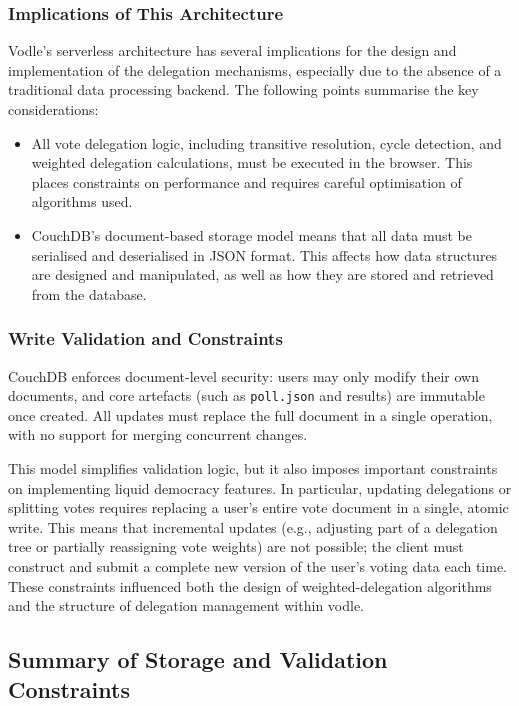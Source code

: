 \subsubsection{Implications of This Architecture}
Vodle's serverless architecture has several implications for the design and implementation of the delegation mechanisms, especially due to the absence of a traditional data processing backend. The following points summarise the key considerations:
\begin{itemize}
  \item All vote delegation logic, including transitive resolution, cycle detection, and weighted delegation calculations, must be executed in the browser. This places constraints on performance and requires careful optimisation of algorithms used.
  \item CouchDB's document-based storage model means that all data must be serialised and deserialised in JSON format. This affects how data structures are designed and manipulated, as well as how they are stored and retrieved from the database.
\end{itemize}

\subsubsection{Write Validation and Constraints}
CouchDB enforces document-level security: users may only modify their own documents, and core artefacts (such as \texttt{poll.json} and results) are immutable once created. All updates must replace the full document in a single operation, with no support for merging concurrent changes.

This model simplifies validation logic, but it also imposes important constraints on implementing liquid democracy features. In particular, updating delegations or splitting votes requires replacing a user's entire vote document in a single, atomic write. This means that incremental updates (e.g., adjusting part of a delegation tree or partially reassigning vote weights) are not possible; the client must construct and submit a complete new version of the user's voting data each time. These constraints influenced both the design of weighted-delegation algorithms and the structure of delegation management within vodle.

\subsection{Summary of Storage and Validation Constraints}
\label{subsec:summary_storage_constraints}

